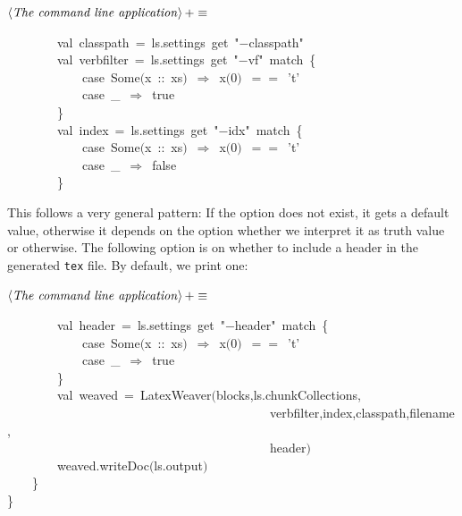 \documentclass[a4paper,12pt]{article}
\begin{document}
$\left<\mbox{\emph{The command line application}}\right>+\equiv$
\begin{program}~~~~~~~~{\vem val}~classpath~=~ls.settings~get~"$-$classpath"
\\[0.5em]~~~~~~~~{\vem val}~verbfilter~=~ls.settings~get~"$-$vf"~{\vem match}~{\small\{}
\\~~~~~~~~~~~~{\vem case}~Some$($x~{\rm :}{\rm :}~xs$)$~$\Rightarrow$~x$($0$)$~$==$~'t'
\\~~~~~~~~~~~~{\vem case}~\_~$\Rightarrow$~{\vem true}
\\~~~~~~~~{\small\}}
\\[0.5em]~~~~~~~~{\vem val}~index~=~ls.settings~get~"$-$idx"~{\vem match}~{\small\{}
\\~~~~~~~~~~~~{\vem case}~Some$($x~{\rm :}{\rm :}~xs$)$~$\Rightarrow$~x$($0$)$~$==$~'t'
\\~~~~~~~~~~~~{\vem case}~\_~$\Rightarrow$~{\vem false}
\\~~~~~~~~{\small\}}
\\[0.5em]\end{program}


This follows a very general pattern: If the option does not exist, it
gets a default value, otherwise it depends on the option whether we interpret
it as truth value or otherwise. The following option is on whether to include
a header in the generated \texttt{tex} file. By default, we print one:

$\left<\mbox{\emph{The command line application}}\right>+\equiv$
\begin{program}~~~~~~~~{\vem val}~header~=~ls.settings~get~"$-$header"~{\vem match}~{\small\{}
\\~~~~~~~~~~~~{\vem case}~Some$($x~{\rm :}{\rm :}~xs$)$~$\Rightarrow$~x$($0$)$~$==$~'t'
\\~~~~~~~~~~~~{\vem case}~\_~$\Rightarrow$~{\vem true}
\\~~~~~~~~{\small\}}
\\[0.5em]~~~~~~~~{\vem val}~weaved~=~LatexWeaver$($blocks,ls.chunkCollections,
\\~~~~~~~~~~~~~~~~~~~~~~~~~~~~~~~~~~~~~~~~~~verbfilter,index,classpath,filename,
\\~~~~~~~~~~~~~~~~~~~~~~~~~~~~~~~~~~~~~~~~~~header$)$
\\[0.5em]~~~~~~~~weaved.writeDoc$($ls.output$)$
\\~~~~{\small\}}
\\{\small\}}
\\[0.5em]\end{program}


 \pagebreak

\classindex
\end{document}
